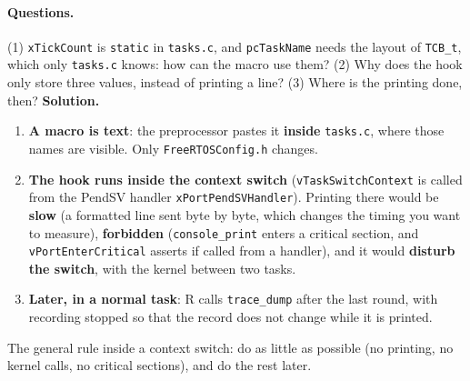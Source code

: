 \paragraph{Questions.} (1) \texttt{xTickCount} is \texttt{static} in \texttt{tasks.c}, and \texttt{pcTaskName} needs the layout of \texttt{TCB\_t}, which only \texttt{tasks.c} knows: how can the macro use them? (2) Why does the hook only store three values, instead of printing a line? (3) Where is the printing done, then?
\textbf{Solution.}
\begin{enumerate}
    \item \textbf{A macro is text}: the preprocessor pastes it \textbf{inside} \texttt{tasks.c}, where those names are visible. Only \texttt{FreeRTOSConfig.h} changes.
    \item \textbf{The hook runs inside the context switch} (\texttt{vTaskSwitchContext} is called from the PendSV handler \texttt{xPortPendSVHandler}). Printing there would be \textbf{slow} (a formatted line sent byte by byte, which changes the timing you want to measure), \textbf{forbidden} (\texttt{console\_print} enters a critical section, and \texttt{vPortEnterCritical} asserts if called from a handler), and it would \textbf{disturb the switch}, with the kernel between two tasks.
    \item \textbf{Later, in a normal task}: R calls \texttt{trace\_dump} after the last round, with recording stopped so that the record does not change while it is printed.
\end{enumerate}
The general rule inside a context switch: do as little as possible (no printing, no kernel calls, no critical sections), and do the rest later.

